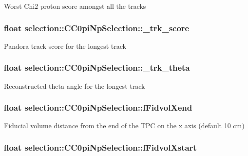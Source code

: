 Worst Chi2 proton score amongst all the tracks \hypertarget{classselection_1_1CC0piNpSelection_a72517a224dc19f95faef3efde9a999d1}{
\subsubsection[{\-\_\-trk\-\_\-score}]{\setlength{\rightskip}{0pt plus 5cm}float selection\-::\-C\-C0pi\-Np\-Selection\-::\-\_\-trk\-\_\-score\hspace{0.3cm}{\ttfamily [private]}}}\label{classselection_1_1CC0piNpSelection_a72517a224dc19f95faef3efde9a999d1}
Pandora track score for the longest track \hypertarget{classselection_1_1CC0piNpSelection_a08cd38de74e9611829a3580a310c19f2}{
\subsubsection[{\-\_\-trk\-\_\-theta}]{\setlength{\rightskip}{0pt plus 5cm}float selection\-::\-C\-C0pi\-Np\-Selection\-::\-\_\-trk\-\_\-theta\hspace{0.3cm}{\ttfamily [private]}}}\label{classselection_1_1CC0piNpSelection_a08cd38de74e9611829a3580a310c19f2}
Reconstructed theta angle for the longest track \hypertarget{classselection_1_1CC0piNpSelection_a754589459e1f2d90a8ad853c68f864db}{
\subsubsection[{f\-Fidvol\-Xend}]{\setlength{\rightskip}{0pt plus 5cm}float selection\-::\-C\-C0pi\-Np\-Selection\-::f\-Fidvol\-Xend\hspace{0.3cm}{\ttfamily [private]}}}\label{classselection_1_1CC0piNpSelection_a754589459e1f2d90a8ad853c68f864db}
Fiducial volume distance from the end of the T\-P\-C on the x axis (default 10 cm) \hypertarget{classselection_1_1CC0piNpSelection_a783e7f9dcd42c083658870f7d23931da}{
\subsubsection[{f\-Fidvol\-Xstart}]{\setlength{\rightskip}{0pt plus 5cm}float selection\-::\-C\-C0pi\-Np\-Selection\-::f\-Fidvol\-Xstart\hspace{0.3cm}{\ttfamily [private]}}}\label{classselection_1_1CC0piNpSelection_a783e7f9dcd42c083658870f7d23931da}
